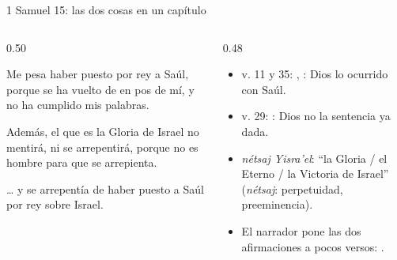 \begin{frame}{1 Samuel 15: las dos cosas en un capítulo}
\begin{columns}[t,onlytextwidth]
\begin{column}{0.50\textwidth}
\begin{cita}Me pesa haber puesto por rey a Saúl, porque se ha vuelto de en pos de mí, y no ha cumplido mis palabras.\end{cita}
\begin{cita}Además, el que es la Gloria de Israel no mentirá, ni se arrepentirá, porque no es hombre para que se arrepienta.\end{cita}
\begin{cita}\ldots{} y \SENOR{} se arrepentía de haber puesto a Saúl por rey sobre Israel.\end{cita}
\end{column}
\begin{column}{0.48\textwidth}\small
\begin{itemize}
\item v. 11 y 35: , : Dios  lo ocurrido con Saúl.
\item v. 29: : Dios no  la sentencia ya dada.
\item {} \emph{nétsaj Yisra'el}: ``la Gloria / el Eterno / la Victoria de Israel'' (\emph{nétsaj}: perpetuidad, preeminencia).
\item El narrador pone las dos afirmaciones a pocos versos: .
\end{itemize}
\end{column}
\end{columns}\par\smallskip
{}
\end{frame}

